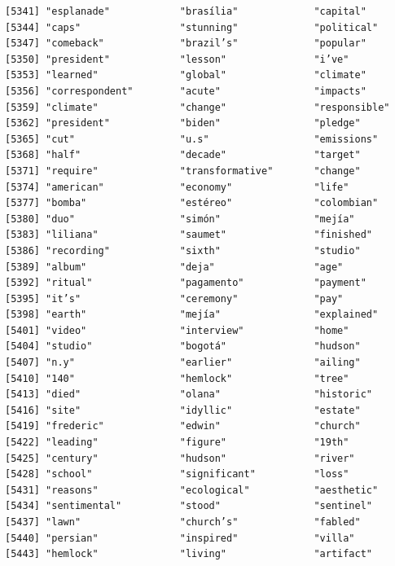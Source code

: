\documentclass[
  letterpaper,
  DIV=11,
  numbers=noendperiod]{scrartcl}
\begin{document}
\begin{verbatim}
[5341] "esplanade"            "brasília"             "capital"             
[5344] "caps"                 "stunning"             "political"           
[5347] "comeback"             "brazil’s"             "popular"             
[5350] "president"            "lesson"               "i’ve"                
[5353] "learned"              "global"               "climate"             
[5356] "correspondent"        "acute"                "impacts"             
[5359] "climate"              "change"               "responsible"         
[5362] "president"            "biden"                "pledge"              
[5365] "cut"                  "u.s"                  "emissions"           
[5368] "half"                 "decade"               "target"              
[5371] "require"              "transformative"       "change"              
[5374] "american"             "economy"              "life"                
[5377] "bomba"                "estéreo"              "colombian"           
[5380] "duo"                  "simón"                "mejía"               
[5383] "liliana"              "saumet"               "finished"            
[5386] "recording"            "sixth"                "studio"              
[5389] "album"                "deja"                 "age"                 
[5392] "ritual"               "pagamento"            "payment"             
[5395] "it’s"                 "ceremony"             "pay"                 
[5398] "earth"                "mejía"                "explained"           
[5401] "video"                "interview"            "home"                
[5404] "studio"               "bogotá"               "hudson"              
[5407] "n.y"                  "earlier"              "ailing"              
[5410] "140"                  "hemlock"              "tree"                
[5413] "died"                 "olana"                "historic"            
[5416] "site"                 "idyllic"              "estate"              
[5419] "frederic"             "edwin"                "church"              
[5422] "leading"              "figure"               "19th"                
[5425] "century"              "hudson"               "river"               
[5428] "school"               "significant"          "loss"                
[5431] "reasons"              "ecological"           "aesthetic"           
[5434] "sentimental"          "stood"                "sentinel"            
[5437] "lawn"                 "church’s"             "fabled"              
[5440] "persian"              "inspired"             "villa"               
[5443] "hemlock"              "living"               "artifact"            

\end{verbatim}
\end{document}
